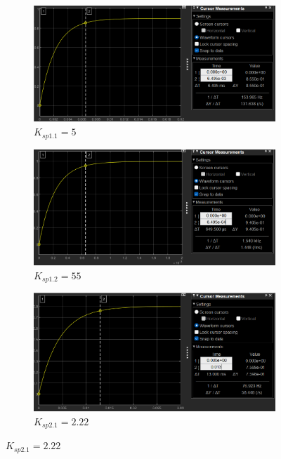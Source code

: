 \documentclass[12pt, a4paper]{report}
\begin{document}
\begin{figure}[h]
    \begin{subfigure}[h!]{0.4\linewidth}
        \includegraphics[width=\linewidth]{s1simk5tr.png}
        \caption{$K_{sp1.1} = 5$}
    \end{subfigure}
    \hfill
    \begin{subfigure}[h!]{0.4\linewidth}
        \includegraphics[width=\linewidth]{s1simk55tr.png}
        \caption{$K_{sp1.2} = 55$}
    \end{subfigure}
    \hfill
    \begin{subfigure}[h!]{0.4\linewidth}
        \includegraphics[width=\linewidth]{s1sim2tr.png}
        \caption{$K_{sp2.1} = 2.22$}

\end{subfigure}
\end{figure}
\end{document}
